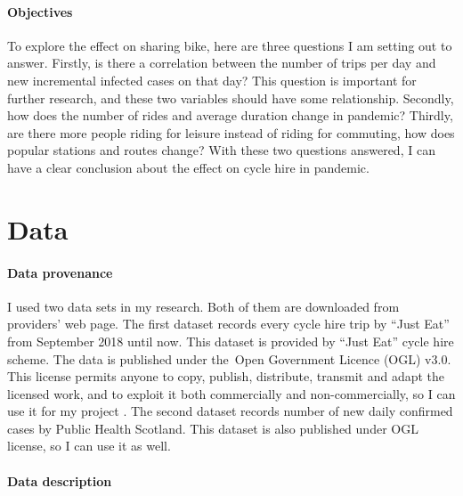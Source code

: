 \documentclass[11pt,a4paper]{article}
\begin{document}

\paragraph{Objectives}


To explore the effect on sharing bike, here are three questions I am setting out to answer. Firstly, is there a correlation between the number of trips per day and new incremental infected cases on that day? This question is important for further research, and these two variables should have some relationship. Secondly, how does the number of rides and average duration change in pandemic? Thirdly, are there more people riding for leisure instead of riding for commuting, how does popular stations and routes change? With these two questions answered, I can have a clear conclusion about the effect on cycle hire in pandemic.

\section{Data}

\paragraph{Data provenance} %

I used two data sets in my research. Both of them are downloaded from providers’ web page. The first dataset records every cycle hire trip by “Just Eat” from September 2018 until now. This dataset is provided by “Just Eat” cycle hire scheme. The data is published under the Open Government Licence (OGL) v3.0. This license permits anyone to copy, publish, distribute, transmit and adapt the licensed work, and to exploit it both commercially and non-commercially, so I can use it for my project \cite{OGL}. The second dataset records number of new daily confirmed cases by Public Health Scotland. This dataset is also published under OGL license, so I can use it as well.

\paragraph{Data description} %
\end{document}
